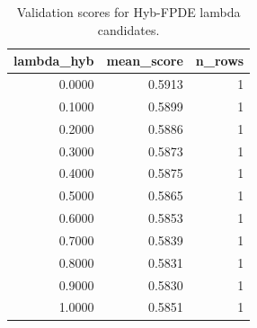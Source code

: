 \begin{table}[t]
\caption{Validation scores for Hyb-FPDE lambda candidates.}
\label{tab:lambda_distribution_computed}
\centering
\begin{tabular}{rrr}
\toprule
lambda\_hyb & mean\_score & n\_rows \\
\midrule
0.0000 & 0.5913 & 1 \\
0.1000 & 0.5899 & 1 \\
0.2000 & 0.5886 & 1 \\
0.3000 & 0.5873 & 1 \\
0.4000 & 0.5875 & 1 \\
0.5000 & 0.5865 & 1 \\
0.6000 & 0.5853 & 1 \\
0.7000 & 0.5839 & 1 \\
0.8000 & 0.5831 & 1 \\
0.9000 & 0.5830 & 1 \\
1.0000 & 0.5851 & 1 \\
\bottomrule
\end{tabular}

\end{table}
